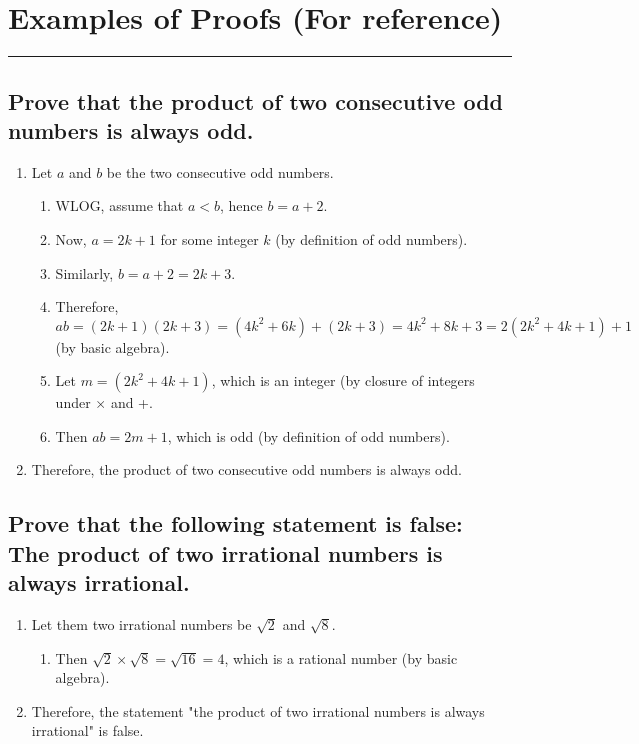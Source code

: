 \documentclass{article}
\begin{document}
\section*{Examples of Proofs (For reference)}
\hrule
\vspace{0.5cm}

\subsection*{Prove that the product of two consecutive odd numbers is always odd.}
\begin{enumerate}
    \item Let $a$ and $b$ be the two consecutive odd numbers. 
    \begin{enumerate}
        \item WLOG, assume that $a<b$, hence $b=a+2$.
        \item Now, $a=2k+1$ for some integer $k$ (by definition of odd numbers).
        \item Similarly, $b=a+2=2k+3$.
        \item Therefore, $ab=(2k+1)(2k+3)=(4k^2+6k)+(2k+3)=4k^2+8k+3=2(2k^2+4k+1)+1$ (by basic algebra).
        \item Let $m=(2k^2+4k+1)$, which is an integer (by closure of integers under $\times$ and +. 
        \item Then $ab=2m+1$, which is odd (by definition of odd numbers).
    \end{enumerate}
    \item Therefore, the product of two consecutive odd numbers is always odd.
\end{enumerate}
\vspace{0.1cm}

\subsection*{Prove that the following statement is false: The product of two irrational numbers is always irrational.}
\begin{enumerate}
    \item Let them two irrational numbers be $\sqrt{2}$ and $\sqrt{8}$. 
    \begin{enumerate}
        \item Then $\sqrt{2}\times\sqrt{8}=\sqrt{16}=4$, which is a rational number (by basic algebra).
    \end{enumerate}
    \item Therefore, the statement "the product of two irrational numbers is always irrational" is false.
\end{enumerate}
\end{document}
